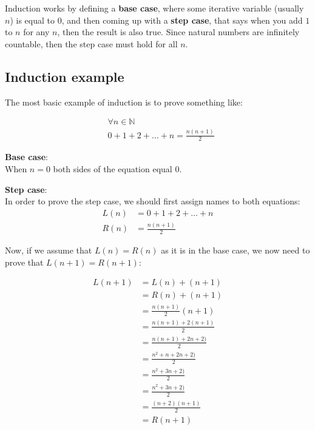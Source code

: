Induction works by defining a {\bf base case}, where some iterative variable
(usually $n$) is equal to $0$, and then coming up with a {\bf step case}, that
says when you add $1$ to $n$ for any $n$, then the result is also true. Since
natural numbers are infinitely countable, then the step case must hold for all
$n$.

\subsection{Induction example}

The most basic example of induction is to prove something like:

\begin{align*}
	&\forall n \in \mathbb{N}\\
	&0 + 1 + 2 + \dots + n = \frac{n(n + 1)}{2}
\end{align*}

\begin{description}
	\item {\bf Base case}:\\
		When $n = 0$ both sides of the equation equal $0$.
	\item {\bf Step case}:\\
		In order to prove the step case, we should first assign names to both equations:
		\[
			\begin{split}
				L(n) &= 0 + 1 + 2 + \dots + n\\
				R(n) &= \frac{n(n + 1)}{2}
			\end{split}
		\]
		
		Now, if we assume that $L(n) = R(n)$ as it is in the base case, we now
		need to prove that $L(n+1) = R(n+1)$:

		\[
			\begin{split}
				L(n + 1) 						 &= L(n) + (n+1)\\
												 &= R(n) + (n + 1)\\
												 &= \frac{n(n + 1)}{2}(n + 1)\\
												 &= \frac{n(n + 1) + 2(n + 1)}{2}\\
												 &= \frac{n(n + 1) + 2n + 2)}{2}\\
												 &= \frac{n^2 + n + 2n + 2)}{2}\\
												 &= \frac{n^2 + 3n + 2)}{2}\\
												 &= \frac{n^2 + 3n + 2)}{2}\\
												 &= \frac{(n + 2)(n + 1)}{2}\\
												 &= R(n+1)
			\end{split}
		\]
\end{description}


